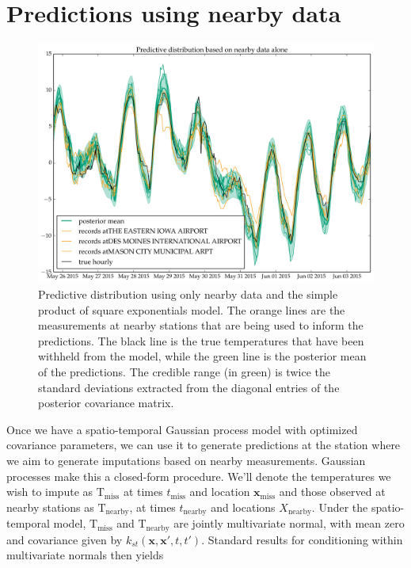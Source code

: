 \documentclass[letter]{article}
\makeatletter
\def\maxwidth{\ifdim\Gin@nat@width>\linewidth\linewidth
\else\Gin@nat@width\fi}
\let\Oldincludegraphics\includegraphics
\renewcommand{\includegraphics}[1]{\Oldincludegraphics[width=.8\maxwidth]{#1}}
\newcommand{\T}{\mathrm{T}}
\newcommand{\xvec}{\mathbold{x}}
\newcommand{\miss}{\mathrm{miss}}
\newcommand{\obs}{\mathrm{nearby}}
\makeatother
\begin{document}
        \section{Predictions using nearby data}\label{predictions-using-nearby-data}
    

\label{sec:predict_nearby}
        \begin{figure}
\centering
\includegraphics{figures/predictive_nearby_SEonly.png}
\caption{\label{fig:predictive_nearby_SEonly}Predictive distribution using only nearby data and the simple product of square exponentials model. The orange lines are the measurements at nearby stations that are being used to inform the predictions. The black line is the true temperatures that have been withheld from the model, while the green line is the posterior mean of the predictions. The credible range (in green) is twice the standard deviations extracted from the diagonal entries of the posterior covariance matrix.}
\end{figure}

Once we have a spatio-temporal Gaussian process model with optimized covariance parameters, we can use it to generate predictions at the station where we aim to generate imputations based on nearby measurements.
Gaussian processes make this a closed-form procedure. We'll denote the temperatures we wish to impute as \(\T_\miss{}\) at times \(t_\miss\) and location \(\xvec_\miss\) and those observed at nearby stations as \(\T_\obs{}\), at times \(t_\obs\) and locations \(X_\obs\).
Under the spatio-temporal model, \(\T_\miss\) and \(\T_\obs\) are jointly multivariate normal, with mean zero and covariance given by \(k_{st}(\xvec,\xvec',t,t')\).
Standard results for conditioning within multivariate normals then yields
\end{document}
